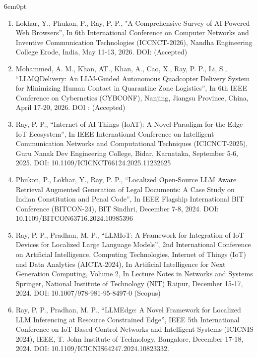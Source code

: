\documentclass[11pt,a4paper]{moderncv}
\begin{document}
\begin{adjustwidth}{6em}{0pt}
	\begin{enumerate}
	
	\item Lokhar, Y., Phukon, P., Ray, P. P., "A Comprehensive Survey of AI-Powered Web Browsers”, In 6th International Conference on Computer Networks and Inventive Communication Technologies (ICCNCT-2026), Nandha Engineering College
	Erode, India, May 11-13, 2026. DOI:  (Accepted)
		
	\item Mohammed, A. M., Khan, AT., Khan, A., Cao, X., Ray, P. P., Li, S., “LLMQDelivery: An LLM-Guided Autonomous Quadcopter Delivery System for Minimizing Human Contact in Quarantine Zone Logistics”, In 6th IEEE Conference on Cybernetics (CYBCONF), Nanjing, Jiangsu Province, China, April 17-20, 2026. DOI : (Accepted)
	
	\item 	Ray, P. P., “Internet of AI Things (IoAT): A Novel Paradigm for the Edge-IoT Ecosystem”, In IEEE International Conference on Intelligent Communication Networks and Computational Techniques (ICICNCT-2025), Guru Nanak Dev Engineering College, Bidar, Karnataka, September 5-6, 2025. DOI: 10.1109/ICICNCT66124.2025.11232625

	\item Phukon, P., Lokhar, Y., Ray, P. P., “Localized Open-Source LLM Aware Retrieval Augmented Generation of Legal Documents: A Case Study on Indian Constitution and Penal Code”, In IEEE Flagship International BIT Conference (BITCON-24), BIT Sindhri, December 7-8, 2024. DOI: 10.1109/BITCON63716.2024.10985396 
	
	\item Ray, P. P., Pradhan, M. P., “LLMIoT: A Framework for Integration of IoT Devices for Localized Large Language Models”, 2nd International Conference on Artificial Intelligence, Computing Technologies, Internet of Things (IoT) and Data Analytics (AICTA-2024), In Artificial Intelligence for Next Generation Computing, Volume 2, In Lecture Notes in Networks and Systems Springer, National Institute of Technology (NIT) Raipur, December 15-17, 2024. DOI: 10.1007/978-981-95-8497-0 (Scopus)
	
	\item Ray, P. P., Pradhan, M. P., “LLMEdge: A Novel Framework for Localized LLM Inferencing at Resource Constrained Edge”, IEEE 5th International Conference on IoT Based Control Networks and Intelligent Systems (ICICNIS 2024), IEEE, T. John Institute of Technology, Bangalore, December 17-18, 2024. DOI: 10.1109/ICICNIS64247.2024.10823332.
	

\end{enumerate}
\end{adjustwidth}
\end{document}
